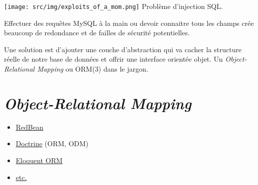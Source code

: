 \texttt{[image: src/img/exploits\_of\_a\_mom.png]} Problème d'injection
SQL.

Effectuer des requêtes MySQL à la main ou devoir connaitre tous les
champs crée beaucoup de redondance et de failles de sécurité
potentielles.

Une solution est d'ajouter une couche d'abstraction qui va cacher la
structure réelle de notre base de données et offrir une interface
orientée objet. Un \emph{Object-Relational Mapping} ou ORM(3) dans le
jargon.

\begin{otherlanguage}{english}

\begin{Shaded}
\begin{Highlighting}[]

\NormalTok{ = }\OtherTok{(}
\OtherTok{);}
\OtherTok{(}\OtherTok{(}\OtherTok{));}
\NormalTok{ = }\OtherTok{(}\NormalTok{::}\OtherTok{);}


\NormalTok{ = }\OtherTok{(}\OtherTok{,} \OtherTok{);}
\NormalTok{ = }\OtherTok{(}\OtherTok{,} \OtherTok{);}
\end{Highlighting}
\end{Shaded}

\end{otherlanguage}

\hypertarget{object-relational-mapping}{%
\section{\texorpdfstring{\emph{Object-Relational
Mapping}}{Object-Relational Mapping}}\label{object-relational-mapping}}

\begin{itemize}
\tightlist
\item
  \href{http://www.redbeanphp.com/}{RedBean}
\item
  \href{http://www.doctrine-project.org/}{Doctrine} (ORM, ODM)
\item
  \href{http://laravel.com/docs/master/eloquent}{Eloquent ORM}
\item
  \href{https://en.wikipedia.org/wiki/List_of_object-relational_mapping_software\#PHP}{etc.}
\end{itemize}

